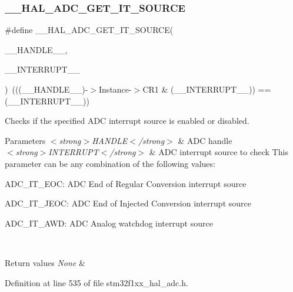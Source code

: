 \subsubsection{\texorpdfstring{\+\_\+\+\_\+\+H\+A\+L\+\_\+\+A\+D\+C\+\_\+\+G\+E\+T\+\_\+\+I\+T\+\_\+\+S\+O\+U\+R\+CE}{\_\_HAL\_ADC\_GET\_IT\_SOURCE}}
{\footnotesize\ttfamily \#define \+\_\+\+\_\+\+H\+A\+L\+\_\+\+A\+D\+C\+\_\+\+G\+E\+T\+\_\+\+I\+T\+\_\+\+S\+O\+U\+R\+CE(\begin{DoxyParamCaption}\item[{}]{\+\_\+\+\_\+\+H\+A\+N\+D\+L\+E\+\_\+\+\_\+,  }\item[{}]{\+\_\+\+\_\+\+I\+N\+T\+E\+R\+R\+U\+P\+T\+\_\+\+\_\+ }\end{DoxyParamCaption})~(((\+\_\+\+\_\+\+H\+A\+N\+D\+L\+E\+\_\+\+\_\+)-\/$>$Instance-\/$>$C\+R1 \& (\+\_\+\+\_\+\+I\+N\+T\+E\+R\+R\+U\+P\+T\+\_\+\+\_\+)) == (\+\_\+\+\_\+\+I\+N\+T\+E\+R\+R\+U\+P\+T\+\_\+\+\_\+))}



Checks if the specified A\+DC interrupt source is enabled or disabled. 


\begin{DoxyParams}{Parameters}
{\em $<$strong$>$\+H\+A\+N\+D\+L\+E$<$/strong$>$} & A\+DC handle \\
\hline
{\em $<$strong$>$\+I\+N\+T\+E\+R\+R\+U\+P\+T$<$/strong$>$} & A\+DC interrupt source to check This parameter can be any combination of the following values\+: \begin{DoxyItemize}
\item A\+D\+C\+\_\+\+I\+T\+\_\+\+E\+OC\+: A\+DC End of Regular Conversion interrupt source \item A\+D\+C\+\_\+\+I\+T\+\_\+\+J\+E\+OC\+: A\+DC End of Injected Conversion interrupt source \item A\+D\+C\+\_\+\+I\+T\+\_\+\+A\+WD\+: A\+DC Analog watchdog interrupt source \end{DoxyItemize}
\\
\hline
\end{DoxyParams}

\begin{DoxyRetVals}{Return values}
{\em None} & \\
\hline
\end{DoxyRetVals}


Definition at line 535 of file stm32f1xx\+\_\+hal\+\_\+adc.\+h.

\mbox{\label{group___a_d_c___exported___macros_gacb290bae25b972942021331122a3600f}} 
